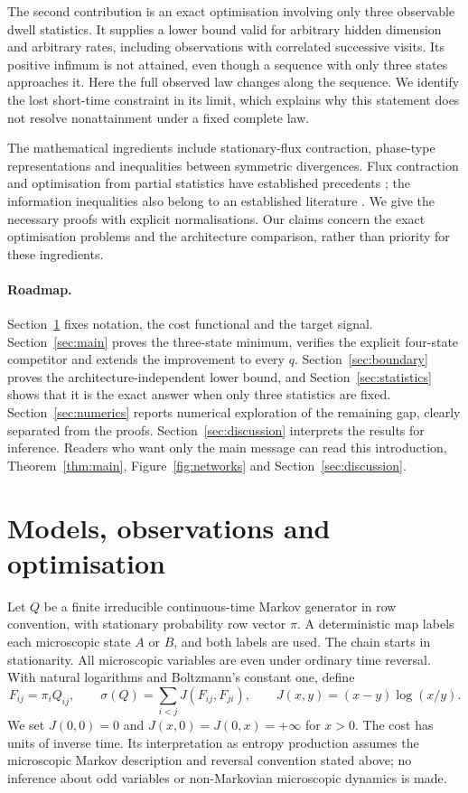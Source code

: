 \documentclass[11pt,a4paper]{article}
\theoremstyle{remark}\newtheorem{remark}[theorem]{Remark}
\begin{document}
The second contribution is an exact optimisation involving only three
observable dwell statistics. It supplies a lower bound valid for arbitrary
hidden dimension and arbitrary rates, including observations with correlated
successive visits. Its positive infimum is not attained, even though a sequence
with only three states approaches it. Here the full observed law changes along
the sequence. We identify the lost short-time constraint in its limit, which
explains why this statement does not resolve nonattainment under a fixed
complete law.

The mathematical ingredients include stationary-flux contraction, phase-type
representations and inequalities between symmetric divergences. Flux
contraction and optimisation from partial statistics have established
precedents \cite{skinner_wait,skinner_improved}; the information inequalities
also belong to an established literature \cite{sason}. We give the necessary
proofs with explicit normalisations. Our claims concern the exact optimisation
problems and the architecture comparison, rather than priority for these
ingredients.

\paragraph{Roadmap.}
Section~\ref{sec:models} fixes notation, the cost functional and the target
signal. Section~\ref{sec:main} proves the three-state minimum, verifies the
explicit four-state competitor and extends the improvement to every $q$.
Section~\ref{sec:boundary} proves the architecture-independent lower bound,
and Section~\ref{sec:statistics} shows that it is the exact answer when only
three statistics are fixed. Section~\ref{sec:numerics} reports numerical
exploration of the remaining gap, clearly separated from the proofs.
Section~\ref{sec:discussion} interprets the results for inference.
Readers who want only the main message can read this introduction,
Theorem~\ref{thm:main}, Figure~\ref{fig:networks} and
Section~\ref{sec:discussion}.

\section{Models, observations and optimisation}
\label{sec:models}

Let $Q$ be a finite irreducible continuous-time Markov generator in row
convention, with stationary probability row vector $\pi$. A deterministic map
labels each microscopic state $A$ or $B$, and both labels are used. The chain
starts in stationarity. All microscopic variables are even under ordinary
time reversal. With natural logarithms and Boltzmann's constant one, define
\begin{equation}\label{eq:epr}
 F_{ij}=\pi_iQ_{ij},\qquad
 \sigma(Q)=\sum_{i<j}J(F_{ij},F_{ji}),\qquad
 J(x,y)=(x-y)\log(x/y).
\end{equation}
We set $J(0,0)=0$ and $J(x,0)=J(0,x)=+\infty$ for $x>0$.
The cost has units of inverse time. Its interpretation as entropy production
assumes the microscopic Markov description and reversal convention stated
above; no inference about odd variables or non-Markovian microscopic dynamics
is made.
\end{document}
